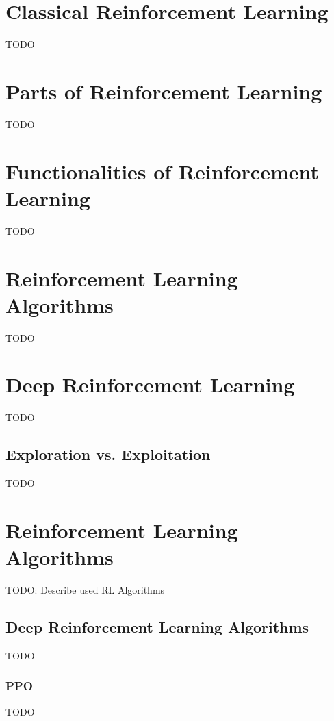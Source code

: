 \section{Classical Reinforcement Learning}\label{sec:classical-reinforcement-learning}
TODO


\section{Parts of Reinforcement Learning}\label{sec:parts-of-reinforcement-learning}
TODO


\section{Functionalities of Reinforcement Learning}\label{sec:functionalities-of-reinforcement-learning}
TODO


\section{Reinforcement Learning Algorithms}\label{sec:reinforcement-learning-algorithms2}
TODO


\section{Deep Reinforcement Learning}\label{sec:deep-reinforcement-learning}
TODO

\subsection{Exploration vs. Exploitation}\label{subsec:exploration-vs.-exploitation}
TODO


\section{Reinforcement Learning Algorithms}\label{sec:reinforcement-learning-algorithms}
TODO: Describe used RL Algorithms

\subsection{Deep Reinforcement Learning Algorithms}\label{subsec:deep-reinforcement-learning-algorithms}
TODO

\subsubsection{PPO}
TODO

